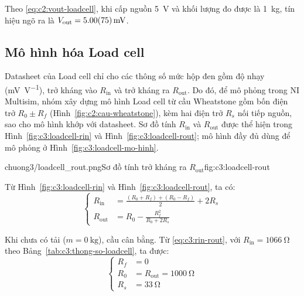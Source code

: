 Theo \eqref{eq:c2:vout-loadcell}, khi cấp nguồn \qty{5}{\volt} và khối lượng đo được là \qty{1}{\kilo\gram},
tín hiệu ngõ ra là $V_{\mathrm{out}} = \qty{5 \pm 0.75}{\milli\volt}$.

\subsection{Mô hình hóa Load cell}
\label{sec:c3:mo-hinh-loadcell}

Datasheet của Load cell chỉ cho các thông số mức hộp đen gồm độ nhạy (\unit{\milli\volt\per\volt}), trở
kháng vào $R_{\mathrm{in}}$ và trở kháng ra $R_{\mathrm{out}}$. Do đó, để mô phỏng trong NI Multisim,
nhóm xây dựng mô hình Load cell từ cầu Wheatstone gồm bốn điện trở $R_0 \pm R_f$ (Hình~\ref{fig:c2:cau-wheatstone}),
kèm hai điện trở $R_s$ nối tiếp nguồn, sao cho mô hình khớp với datasheet. Sơ đồ tính $R_{\mathrm{in}}$ và
$R_{\mathrm{out}}$ được thể hiện trong Hình~\ref{fig:c3:loadcell-rin} và Hình~\ref{fig:c3:loadcell-rout};
mô hình đầy đủ dùng để mô phỏng ở Hình~\ref{fig:c3:loadcell-mo-hinh}.

%
        {chuong3/loadcell_rout.png}{Sơ đồ tính trở kháng ra $R_{\mathrm{out}}$}{fig:c3:loadcell-rout}


Từ Hình~\ref{fig:c3:loadcell-rin} và Hình~\ref{fig:c3:loadcell-rout}, ta có:
\begin{equation}
    \left\{
    \begin{aligned}
        R_{\mathrm{in}}  &= \frac{(R_0 + R_f) + (R_0 - R_f)}{2} + 2R_s \\
        R_{\mathrm{out}} &= R_0 - \frac{R_f^2}{R_0 + 2R_s}
    \end{aligned}
    \right.
    \label{eq:c3:rin-rout}
\end{equation}

Khi chưa có tải ($m = \qty{0}{\kilo\gram}$), cầu cân bằng. Từ \eqref{eq:c3:rin-rout}, với
$R_{\mathrm{in}} = \qty{1066}{\ohm}$ theo Bảng~\ref{tab:c3:thong-so-loadcell}, ta được:
\[
    \left\{
    \begin{aligned}
        R_f &= 0 \\
        R_0 &= R_{\mathrm{out}} = \qty{1000}{\ohm} \\
        R_s &= \qty{33}{\ohm}
    \end{aligned}
    \right.
\]


